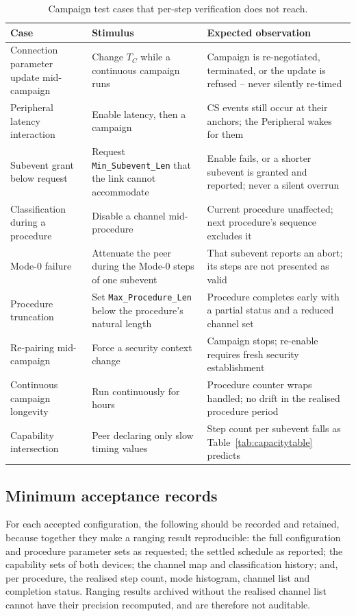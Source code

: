 \documentclass[11pt,a4paper]{article}
\newcommand{\code}[1]{\texttt{\small #1}}
\newcommand{\Tconn}{T_{C}}
\begin{document}
\begin{table}[htb]
\caption{Campaign test cases that per-step verification does not reach.}
\label{tab:tests}
\centering\small
\begin{tabular}{@{}L{40mm}L{44mm}L{46mm}@{}}
\toprule
Case & Stimulus & Expected observation \\
\midrule
Connection parameter update mid-campaign
  & Change $\Tconn$ while a continuous campaign runs
  & Campaign is re-negotiated, terminated, or the update is refused -- never silently re-timed \\
Peripheral latency interaction
  & Enable latency, then a campaign
  & CS events still occur at their anchors; the Peripheral wakes for them \\
Subevent grant below request
  & Request \code{Min\_Subevent\_Len} that the link cannot accommodate
  & Enable fails, or a shorter subevent is granted and reported; never a silent overrun \\
Classification during a procedure
  & Disable a channel mid-procedure
  & Current procedure unaffected; next procedure's sequence excludes it \\
Mode-0 failure
  & Attenuate the peer during the Mode-0 steps of one subevent
  & That subevent reports an abort; its steps are not presented as valid \\
Procedure truncation
  & Set \code{Max\_Procedure\_Len} below the procedure's natural length
  & Procedure completes early with a partial status and a reduced channel set \\
Re-pairing mid-campaign
  & Force a security context change
  & Campaign stops; re-enable requires fresh security establishment \\
Continuous campaign longevity
  & Run continuously for hours
  & Procedure counter wraps handled; no drift in the realised procedure period \\
Capability intersection
  & Peer declaring only slow timing values
  & Step count per subevent falls as Table~\ref{tab:capacitytable} predicts \\
\bottomrule
\end{tabular}
\end{table}

\subsection{Minimum acceptance records}

For each accepted configuration, the following should be recorded and retained, because together they
make a ranging result reproducible: the full configuration and procedure parameter sets as requested;
the settled schedule as reported; the capability sets of both devices; the channel map and
classification history; and, per procedure, the realised step count, mode histogram, channel list and
completion status. Ranging results archived without the realised channel list cannot have their
precision recomputed, and are therefore not auditable.
\end{document}
